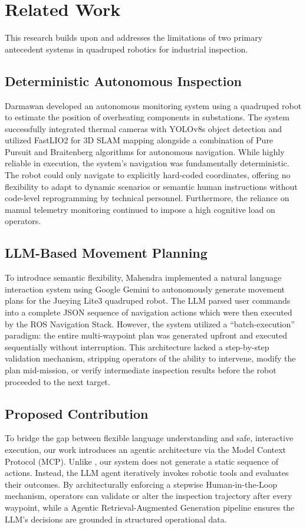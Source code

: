 \documentclass[conference]{IEEEtran}
\begin{document}
\section{Related Work}

This research builds upon and addresses the limitations of two primary antecedent systems in quadruped robotics for industrial inspection.

\subsection{Deterministic Autonomous Inspection}
Darmawan \cite{Darmawan2025} developed an autonomous monitoring system using a quadruped robot to estimate the position of overheating components in substations. The system successfully integrated thermal cameras with YOLOv8s object detection and utilized FastLIO2 for 3D SLAM mapping alongside a combination of Pure Pursuit and Braitenberg algorithms for autonomous navigation. While highly reliable in execution, the system's navigation was fundamentally deterministic. The robot could only navigate to explicitly hard-coded coordinates, offering no flexibility to adapt to dynamic scenarios or semantic human instructions without code-level reprogramming by technical personnel. Furthermore, the reliance on manual telemetry monitoring continued to impose a high cognitive load on operators.

\subsection{LLM-Based Movement Planning}
To introduce semantic flexibility, Mahendra \cite{Mahendra2024} implemented a natural language interaction system using Google Gemini to autonomously generate movement plans for the Jueying Lite3 quadruped robot. The LLM parsed user commands into a complete JSON sequence of navigation actions which were then executed by the ROS Navigation Stack. However, the system utilized a ``batch-execution'' paradigm: the entire multi-waypoint plan was generated upfront and executed sequentially without interruption. This architecture lacked a step-by-step validation mechanism, stripping operators of the ability to intervene, modify the plan mid-mission, or verify intermediate inspection results before the robot proceeded to the next target.

\subsection{Proposed Contribution}
To bridge the gap between flexible language understanding and safe, interactive execution, our work introduces an agentic architecture via the Model Context Protocol (MCP). Unlike \cite{Mahendra2024}, our system does not generate a static sequence of actions. Instead, the LLM agent iteratively invokes robotic tools and evaluates their outcomes. By architecturally enforcing a stepwise Human-in-the-Loop mechanism, operators can validate or alter the inspection trajectory after every waypoint, while a Agentic Retrieval-Augmented Generation pipeline ensures the LLM's decisions are grounded in structured operational data.
\end{document}
